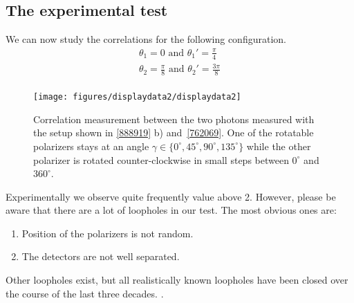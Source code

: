 \documentclass[10pt]{article}
\let\cite\citep
\providecommand\citep{\cite}
\begin{document}
\subsection{The experimental test}

We can now study the correlations for the following configuration.
\begin{align}
\theta_1 = 0 \text{ and }\theta_1' = \frac{\pi}{4}\\
\theta_2 = \frac{\pi}{8} \text{ and }\theta_2' = \frac{3\pi}{8}\\
\end{align}
\begin{figure}[h!]
\begin{center}
\texttt{[image: figures/displaydata2/displaydata2]}
\caption{{Correlation measurement between the two photons measured with the setup
shown in {\ref{888919}} b)
and~{\ref{762069}}. One of the rotatable polarizers
stays at an angle \(\gamma \in \{ 0^\circ, 45^\circ, 90^\circ, 135^\circ \}\) while the other polarizer is
rotated counter-clockwise in small steps between \(0^{\circ}\) and
\(360^{\circ}\).
{\label{358356}}%
}}
\end{center}
\end{figure}

Experimentally we observe quite frequently value above 2. However,
please be aware that there are a lot of loopholes in our test. The most
obvious ones are:

\begin{enumerate}
\tightlist
\item
  Position of the polarizers is not random.
\item
  The detectors are not well separated.
\end{enumerate}

Other loopholes exist, but all realistically known loopholes have been
closed over the course of the last three decades. \cite{Giustina_2015,Shalm_2015,Hensen_2015}.

\FloatBarrier


\end{document}
